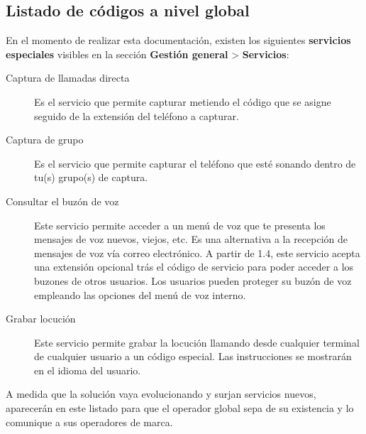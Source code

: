 \documentclass[letterpaper,10pt,spanish]{sphinxmanual}
\begin{document}
\subsection{Listado de códigos a nivel global}
\label{pbx_features/services:global-services-codes}
En el momento de realizar esta documentación, existen los siguientes \textbf{servicios especiales} visibles en la sección \textbf{Gestión general} \textgreater{} \textbf{Servicios}:

\noindent{}
\begin{description}
\item[{Captura de llamadas directa}] \leavevmode{}\label{pbx_features/services:term-direct-pickup}
Es el servicio que permite capturar metiendo el código que se asigne seguido de la extensión del teléfono a capturar.

\item[{Captura de grupo}] \leavevmode{}\label{pbx_features/services:term-group-pickup}
Es el servicio que permite capturar el teléfono que esté sonando dentro de tu(s) grupo(s) de captura.

\item[{Consultar el buzón de voz}] \leavevmode{}\label{pbx_features/services:term-check-voicemail}
Este servicio permite acceder a un menú de voz que te presenta los mensajes de voz nuevos, viejos, etc. Es una alternativa a la recepción de mensajes de voz vía correo electrónico. A partir de 1.4, este servicio acepta una extensión opcional trás el código de servicio para poder acceder a los buzones de otros usuarios. Los usuarios pueden proteger su buzón de voz empleando las opciones del menú de voz interno.

\item[{Grabar locución}] \leavevmode{}\label{pbx_features/services:term-record-locution}
Este servicio permite grabar la locución llamando desde cualquier terminal de cualquier usuario a un código especial. Las instrucciones se mostrarán en el idioma del usuario.

\end{description}

A medida que la solución vaya evolucionando y surjan servicios nuevos, aparecerán en este listado para que el operador global sepa de su existencia y lo comunique a sus operadores de marca.
\end{document}
